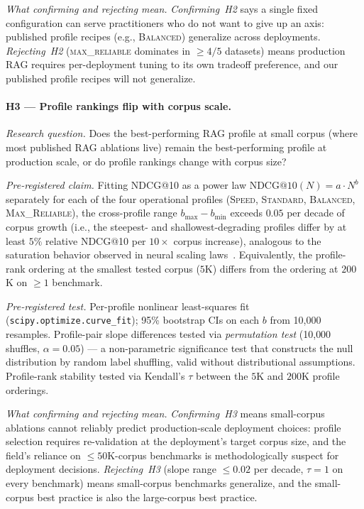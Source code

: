 \documentclass[11pt]{article}
\begin{document}
\textit{What confirming and rejecting mean.} \emph{Confirming~H2}
says a single fixed configuration can serve practitioners who do not
want to give up an axis: published profile recipes (e.g., \textsc{Balanced})
generalize across deployments.  \emph{Rejecting~H2}
(\textsc{max\_reliable} dominates in $\geq 4 / 5$ datasets) means
production RAG requires per-deployment tuning to its own tradeoff
preference, and our published profile recipes will not generalize.

\paragraph{H3 --- Profile rankings flip with corpus scale.}

\textit{Research question.} Does the best-performing RAG profile at
small corpus (where most published RAG ablations live) remain the
best-performing profile at production scale, or do profile rankings
change with corpus size?

\textit{Pre-registered claim.} Fitting NDCG@10 as a power law
$\text{NDCG@10}(N) = a \cdot N^{b}$ separately for each of the four
operational profiles (\textsc{Speed}, \textsc{Standard},
\textsc{Balanced}, \textsc{Max\_Reliable}), the cross-profile range
$b_{\max} - b_{\min}$ exceeds $0.05$ per decade of corpus growth
(i.e., the steepest- and shallowest-degrading profiles differ by at
least $5\%$ relative NDCG@10 per $10\times$ corpus increase),
analogous to the saturation behavior observed in neural scaling
laws~\citep{kaplan2020scaling}.  Equivalently, the profile-rank
ordering at the smallest tested corpus ($5$K) differs from the
ordering at $200$K on $\geq 1$ benchmark.

\textit{Pre-registered test.} Per-profile nonlinear least-squares
fit (\texttt{scipy.optimize.curve\_fit}); 95\% bootstrap CIs on each
$b$ from 10{,}000 resamples.  Profile-pair slope differences tested
via \emph{permutation test} (10{,}000 shuffles, $\alpha = 0.05$) ---
a non-parametric significance test that constructs the null
distribution by random label shuffling, valid without distributional
assumptions.  Profile-rank stability tested via Kendall's $\tau$
between the $5$K and $200$K profile orderings.

\textit{What confirming and rejecting mean.} \emph{Confirming~H3}
means small-corpus ablations cannot reliably predict production-scale
deployment choices: profile selection requires re-validation at the
deployment's target corpus size, and the field's reliance on
$\leq 50$K-corpus benchmarks is methodologically suspect for
deployment decisions.  \emph{Rejecting~H3} (slope range $\leq 0.02$
per decade, $\tau = 1$ on every benchmark) means small-corpus
benchmarks generalize, and the small-corpus best practice is also the
large-corpus best practice.
\end{document}
